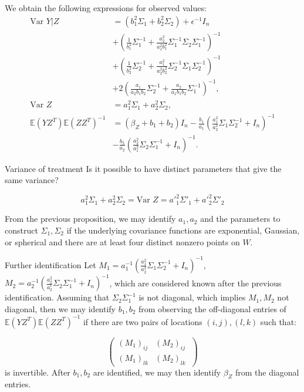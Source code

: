 \documentclass[10 pt]{beamer}
\newcommand{\E}{{\mathbb E}}
\newcommand{\Var}{\text{Var }}
\begin{document}
\begin{frame}
We obtain the following expressions for observed values:
\begin{align*}
\Var Y|Z 
&= (b_1^2\Sigma_1+b_2^2\Sigma_2)+\epsilon^{-1} I_n \\ &+\left(\frac{1}{b_1^2}\Sigma_1^{-1} + \frac{a_2^2}{a^2_1b^2_1} \Sigma^{-1}_1\Sigma_2\Sigma^{-1}_1 \right)^{-1}\\ &+  \left(\frac{1}{b_2^2}\Sigma_2^{-1} +  \frac{a_1^2}{a^2_2b^2_2} \Sigma^{-1}_2\Sigma_1\Sigma^{-1}_2 \right)^{-1}\\ &+ 2\left( \frac{a_1}{a_2b_1b_2}\Sigma^{-1}_2 + \frac{a_2}{a_1b_1b_2}\Sigma^{-1}_1\right)^{-1}, \\
\Var Z &= a_1^2 \Sigma_1 + a_2^2 \Sigma_2, \\
\E(YZ^T)\E(ZZ^T)^{-1} 
&= (\beta_Z+b_1+b_2)I_n - \frac{b_1}{a_1}\left(\frac{a_1^2}{a_2^2} \Sigma_1\Sigma^{-1}_2 + I_n \right)^{-1} \\ &-\frac{b_2}{a_2}\left(\frac{a_2^2}{a_1^2} \Sigma_2\Sigma^{-1}_1 + I_n \right)^{-1}
.
\end{align*}
\end{frame}

\begin{frame}{Variance of treatment}
Is it possible to have distinct parameters that give the same variance?

\[a_1^2\Sigma_1 + a_2^2\Sigma_2 = \Var Z = a'^2_1\Sigma'_1 + a'^2_2\Sigma'_2\]

From the previous proposition, we may identify $a_1, a_2$ and the parameters to construct $\Sigma_1, \Sigma_2$ if the underlying covariance functions are exponential, Gaussian, or spherical and there are at least four distinct nonzero points on $W$.
\end{frame}

\begin{frame}{Further identification}
Let $M_1 = a_1^{-1}\left(\frac{a_1^2}{a^2_2} \Sigma_1\Sigma^{-1}_2 + I_n \right)^{-1}$, $M_2 = a_2^{-1}\left(\frac{a_2^2}{a^1_2} \Sigma_2\Sigma^{-1}_1 + I_n \right)^{-1}$, which are considered known after the previous identification.\bigskip
Assuming that $\Sigma_2\Sigma_1^{-1}$ is not diagonal, which implies $M_1, M_2$ not diagonal, then we may identify $b_1, b_2$ from observing the off-diagonal entries of $\E(YZ^T)\E(ZZ^T)^{-1}$ if there are two pairs of locations $(i,j), (l,k)$ such that:

\[\begin{pmatrix} 
(M_1)_{ij} & (M_2)_{ij}\\
(M_1)_{lk} & (M_2)_{lk}\
\end{pmatrix}\] is invertible. After $b_1, b_2$ are identified, we may then identify $\beta_Z$ from the diagonal entries.
\end{frame}
\end{document}
